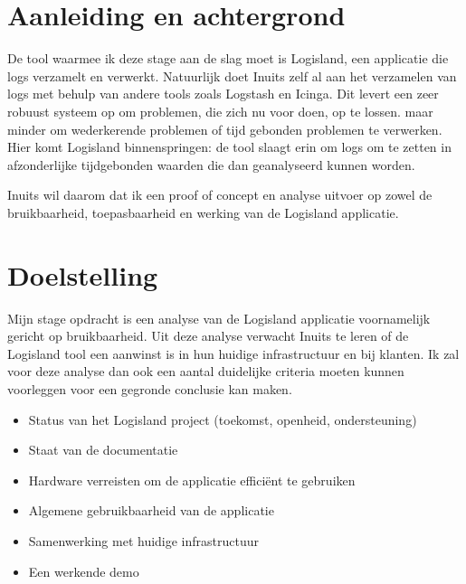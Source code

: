 \documentclass[a4paper]{article}
\begin{document}
\newpage{}
\section{Aanleiding en achtergrond}
De tool waarmee ik deze stage aan de slag moet is Logisland, een applicatie die logs verzamelt en verwerkt.
Natuurlijk doet Inuits zelf al aan het verzamelen van logs met behulp van andere tools zoals Logstash en Icinga.
Dit levert een zeer robuust systeem op om problemen, die zich nu voor doen, op te lossen. maar minder om wederkerende problemen of tijd gebonden problemen te verwerken.
Hier komt Logisland binnenspringen: de tool slaagt erin om logs om te zetten in afzonderlijke tijdgebonden waarden die dan geanalyseerd kunnen worden.
\par
Inuits wil daarom dat ik een proof of concept en analyse uitvoer op zowel de bruikbaarheid, toepasbaarheid en werking van de Logisland applicatie. 

\newpage{}
\section{Doelstelling}
Mijn stage opdracht is een analyse van de Logisland applicatie voornamelijk gericht op bruikbaarheid. 
Uit deze analyse verwacht Inuits te leren of de Logisland tool een aanwinst is in hun huidige infrastructuur en bij klanten.
Ik zal voor deze analyse dan ook een aantal duidelijke criteria moeten kunnen voorleggen voor een gegronde conclusie kan maken.
\par
\begin{itemize}
\item Status van het Logisland project (toekomst, openheid, ondersteuning)
\item Staat van de documentatie 
\item Hardware verreisten om de applicatie efficiënt te gebruiken
\item Algemene gebruikbaarheid van de applicatie
\item Samenwerking met huidige infrastructuur
\item Een werkende demo

\end{itemize}

\newpage{}
\end{document}
